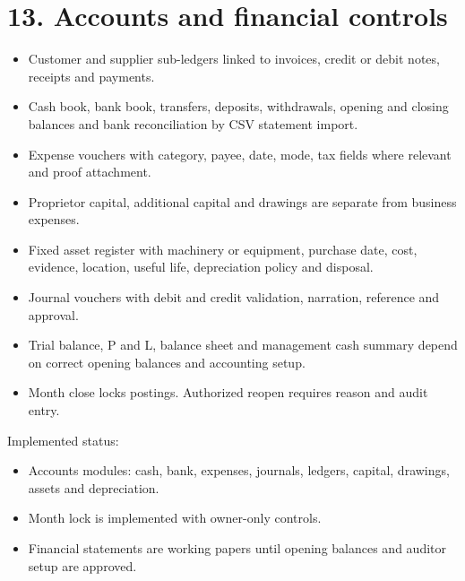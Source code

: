 \documentclass[11pt]{article}
\begin{document}
\section{13. Accounts and financial controls}
\begin{itemize}[leftmargin=*,itemsep=2pt,topsep=2pt]
\item Customer and supplier sub-ledgers linked to invoices, credit or debit notes, receipts and payments.
\item Cash book, bank book, transfers, deposits, withdrawals, opening and closing balances and bank reconciliation by CSV statement import.
\item Expense vouchers with category, payee, date, mode, tax fields where relevant and proof attachment.
\item Proprietor capital, additional capital and drawings are separate from business expenses.
\item Fixed asset register with machinery or equipment, purchase date, cost, evidence, location, useful life, depreciation policy and disposal.
\item Journal vouchers with debit and credit validation, narration, reference and approval.
\item Trial balance, P and L, balance sheet and management cash summary depend on correct opening balances and accounting setup.
\item Month close locks postings. Authorized reopen requires reason and audit entry.
\end{itemize}
Implemented status:
\begin{itemize}[leftmargin=*,itemsep=2pt,topsep=2pt]
\item Accounts modules: cash, bank, expenses, journals, ledgers, capital, drawings, assets and depreciation.
\item Month lock is implemented with owner-only controls.
\item Financial statements are working papers until opening balances and auditor setup are approved.
\end{itemize}
\clearpage
\end{document}
